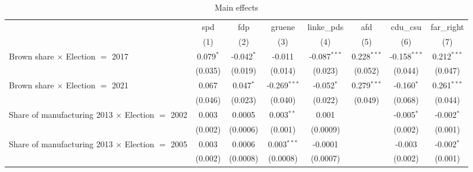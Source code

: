 \begin{table}[htbp]
   \caption{Main effects}
   \centering
   \begin{tabular}{lccccccc}
      \tabularnewline \midrule \midrule
                                                              & spd                  & fdp                   & gruene                & linke\_pds     & afd            & cdu\_csu       & far\_right\\   
                                                              & (1)                  & (2)                   & (3)                   & (4)            & (5)            & (6)            & (7)\\  
      Brown share $\times$ Election $=$ 2017                  & 0.079$^{*}$          & -0.042$^{*}$          & -0.011                & -0.087$^{***}$ & 0.228$^{***}$  & -0.158$^{***}$ & 0.212$^{***}$\\   
                                                              & (0.035)              & (0.019)               & (0.014)               & (0.023)        & (0.052)        & (0.044)        & (0.047)\\   
      Brown share $\times$ Election $=$ 2021                  & 0.067                & 0.047$^{*}$           & -0.269$^{***}$        & -0.052$^{*}$   & 0.279$^{***}$  & -0.160$^{*}$   & 0.261$^{***}$\\   
                                                              & (0.046)              & (0.023)               & (0.040)               & (0.022)        & (0.049)        & (0.068)        & (0.044)\\   
      Share of manufacturing 2013 $\times$ Election $=$ 2002  & 0.003                & 0.0005                & 0.003$^{**}$          & 0.001          &                & -0.005$^{*}$   & -0.002$^{*}$\\   
                                                              & (0.002)              & (0.0006)              & (0.001)               & (0.0009)       &                & (0.002)        & (0.001)\\   
      Share of manufacturing 2013 $\times$ Election $=$ 2005  & 0.003                & 0.0006                & 0.003$^{***}$         & -0.0001        &                & -0.003         & -0.002$^{*}$\\   
                                                              & (0.002)              & (0.0008)              & (0.0008)              & (0.0007)       &                & (0.002)        & (0.001)\\   

\end{tabular}
\end{table}
